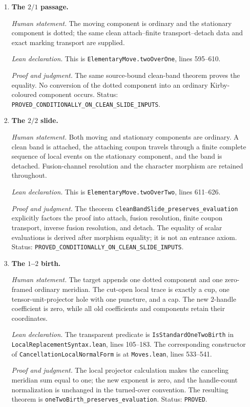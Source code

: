 \begin{enumerate}[label=\textbf{M\arabic*.},leftmargin=*]
\item \textbf{The $2/1$ passage.}

\emph{Human statement.}
The moving component is ordinary and the stationary component is dotted; the
same clean attach--finite transport--detach data and exact marking transport
are supplied.

\emph{Lean declaration.}
This is \texttt{ElementaryMove.twoOverOne}, lines 595--610.

\emph{Proof and judgment.}
The same source-bound clean-band theorem proves the equality.  No conversion
of the dotted component into an ordinary Kirby-coloured component occurs.
Status: \nolinkurl{PROVED_CONDITIONALLY_ON_CLEAN_SLIDE_INPUTS}.

\item \textbf{The $2/2$ slide.}

\emph{Human statement.}
Both moving and stationary components are ordinary.  A clean band is attached,
the attaching coupon travels through a finite complete sequence of local
events on the stationary component, and the band is detached.  Fusion-channel
resolution and the character morphism are retained throughout.

\emph{Lean declaration.}
This is \texttt{ElementaryMove.twoOverTwo}, lines 611--626.

\emph{Proof and judgment.}
The theorem \nolinkurl{cleanBandSlide_preserves_evaluation} explicitly factors
the proof into attach, fusion resolution, finite coupon transport, inverse
fusion resolution, and detach.  The equality of scalar evaluations is derived
after morphism equality; it is not an entrance axiom.  Status:
\nolinkurl{PROVED_CONDITIONALLY_ON_CLEAN_SLIDE_INPUTS}.

\item \textbf{The $1$--$2$ birth.}

\emph{Human statement.}
The target appends one dotted component and one zero-framed ordinary meridian.
The cut-open local trace is exactly a cup, one tensor-unit-projector hole with
one puncture, and a cap.  The new $2$-handle coefficient is zero, while all old
coefficients and components retain their coordinates.

\emph{Lean declaration.}
The transparent predicate is \nolinkurl{IsStandardOneTwoBirth} in
\nolinkurl{LocalReplacementSyntax.lean}, lines 105--183.  The corresponding
constructor of \nolinkurl{CancellationLocalNormalForm} is at
\nolinkurl{Moves.lean}, lines 533--541.

\emph{Proof and judgment.}
The local projector calculation makes the canceling meridian sum equal to
one; the new exponent is zero, and the handle-count normalization is unchanged
in the turned-over convention.  The resulting theorem is
\nolinkurl{oneTwoBirth_preserves_evaluation}.  Status: \texttt{PROVED}.


\end{enumerate}
